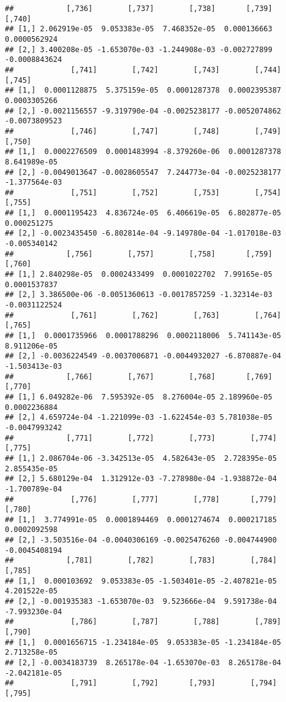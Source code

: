 \documentclass[
]{article}
\begin{document}
\begin{verbatim}
##            [,736]        [,737]        [,738]       [,739]        [,740]
## [1,] 2.062919e-05  9.053383e-05  7.468352e-05  0.000136663  0.0000562924
## [2,] 3.400208e-05 -1.653070e-03 -1.244908e-03 -0.002727899 -0.0008843624
##             [,741]        [,742]        [,743]        [,744]        [,745]
## [1,]  0.0001128875  5.375159e-05  0.0001287378  0.0002395387  0.0003305266
## [2,] -0.0021156557 -9.319790e-04 -0.0025238177 -0.0052074862 -0.0073809523
##             [,746]        [,747]        [,748]        [,749]        [,750]
## [1,]  0.0002276509  0.0001483994 -8.379260e-06  0.0001287378  8.641989e-05
## [2,] -0.0049013647 -0.0028605547  7.244773e-04 -0.0025238177 -1.377564e-03
##             [,751]        [,752]        [,753]        [,754]       [,755]
## [1,]  0.0001195423  4.836724e-05  6.406619e-05  6.802877e-05  0.000251275
## [2,] -0.0023435450 -6.802814e-04 -9.149780e-04 -1.017018e-03 -0.005340142
##            [,756]        [,757]        [,758]       [,759]        [,760]
## [1,] 2.840298e-05  0.0002433499  0.0001022702  7.99165e-05  0.0001537837
## [2,] 3.386500e-06 -0.0051360613 -0.0017857259 -1.32314e-03 -0.0031122524
##             [,761]        [,762]        [,763]        [,764]        [,765]
## [1,]  0.0001735966  0.0001788296  0.0002118006  5.741143e-05  8.911206e-05
## [2,] -0.0036224549 -0.0037006871 -0.0044932027 -6.870887e-04 -1.503413e-03
##            [,766]        [,767]        [,768]       [,769]        [,770]
## [1,] 6.049282e-06  7.595392e-05  8.276004e-05 2.189960e-05  0.0002236884
## [2,] 4.659724e-04 -1.221099e-03 -1.622454e-03 5.781038e-05 -0.0047993242
##            [,771]        [,772]        [,773]        [,774]        [,775]
## [1,] 2.086704e-06 -3.342513e-05  4.582643e-05  2.728395e-05  2.855435e-05
## [2,] 5.680129e-04  1.312912e-03 -7.278980e-04 -1.938872e-04 -1.700789e-04
##             [,776]        [,777]        [,778]       [,779]        [,780]
## [1,]  3.774991e-05  0.0001894469  0.0001274674  0.000217185  0.0002092598
## [2,] -3.503516e-04 -0.0040306169 -0.0025476260 -0.004744900 -0.0045408194
##            [,781]        [,782]        [,783]        [,784]        [,785]
## [1,]  0.000103692  9.053383e-05 -1.503401e-05 -2.407821e-05  4.201522e-05
## [2,] -0.001935383 -1.653070e-03  9.523666e-04  9.591738e-04 -7.993230e-04
##             [,786]        [,787]        [,788]        [,789]        [,790]
## [1,]  0.0001656715 -1.234184e-05  9.053383e-05 -1.234184e-05  2.713258e-05
## [2,] -0.0034183739  8.265178e-04 -1.653070e-03  8.265178e-04 -2.042181e-05
##             [,791]        [,792]       [,793]        [,794]        [,795]

\end{verbatim}
\end{document}
